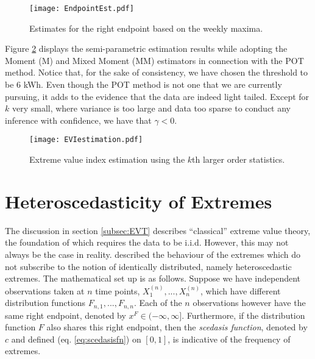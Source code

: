 \begin{figure}
\begin{center}
\texttt{[image: EndpointEst.pdf]}
\caption{Estimates for the right endpoint based on the weekly maxima.} \label{fig:EndPointEst}
\end{center}
\end{figure}

Figure \ref{fig:POTEst} displays the semi-parametric estimation results while adopting the Moment (M) and Mixed Moment (MM) estimators in connection with the POT method. Notice that, for the sake of consistency, we have chosen the threshold to be 6 kWh. Even though the POT method is not one that we are currently pursuing, it adds to the evidence that the data are indeed light tailed. Except for $k$ very small, where variance is too large and data too sparse to conduct any inference with confidence, we have that $\gamma < 0$.  

\begin{figure}
\begin{center}
\texttt{[image: EVIestimation.pdf]}
\caption{Extreme value index estimation using the $k$th larger order statistics.} \label{fig:POTEst}
\end{center}
\end{figure}

\section{Heteroscedasticity of Extremes} \label{subsec:sced}

The discussion in section \ref{subsec:EVT} describes ``classical'' extreme value theory, the foundation of which requires the data to be i.i.d. However, this may not always be the case in reality. \cite{einmahl16} described the behaviour of the extremes which do not subscribe to the notion of identically distributed, namely heteroscedastic extremes. The mathematical set up is as follows. Suppose we have independent observations taken at $n$ time points, $X_1^{(n)} , ... , X_n^{(n)}$, which have different distribution functions $F_{n,1}, ... , F_{n,n}$. Each of the $n$ observations however have the same right endpoint, denoted by $x^F \in (-\infty, \infty]$. Furthermore, if the distribution function $F$ also shares this right endpoint, then the \textit{scedasis function}, denoted by $c$ and defined (eq. \ref{eq:scedasisfn}) on $[0,1]$, is indicative of the frequency of extremes.

